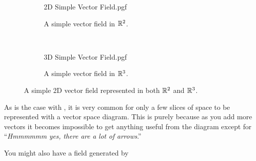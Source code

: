 \documentclass[main.tex]{subfiles}
\begin{document}
            \begin{figure}[!h]
                \centering
                \begin{subfigure}[h]{0.45\textwidth}
                    \vspace*{7mm}
                    \centering
                    \scalebox{0.65}
                    {
                        \begin{adjustbox}{clip,trim=30mm 15mm 25mm 10mm}
                            {{2D Simple Vector Field.pgf}}
                        \end{adjustbox}
                    }
                    \caption{A simple vector field in $\mathbb{R}^2$.}
                    \label{subfig: Simple 2D Field}
                \end{subfigure}
                ~
                \begin{subfigure}[h]{0.45\textwidth}
                    \centering
                    \scalebox{0.9}
                    {
                        \begin{adjustbox}{clip,trim=40mm 25mm 10mm 20mm}
                            {{3D Simple Vector Field.pgf}}
                        \end{adjustbox}
                    }
                    \caption{A simple vector field in $\mathbb{R}^3$.}
                    \label{subfig: Simple 3D Field}
                \end{subfigure}

                \vspace{2mm}

                \caption{A simple 2D vector field represented in both $\mathbb{R}^2$ and $\mathbb{R}^3$.}
                \label{fig: Simple Vector Field}
            \end{figure}
            \FloatBarrier

            As is the case with , it is very common for only a few slices of space to be represented with a vector space diagram. This is purely because as you add more vectors it becomes impossible to get anything useful from the diagram except for ``\textit{Hmmmmmm yes, there are a lot of arrows}.''

            You might also have a field generated by
\end{document}
